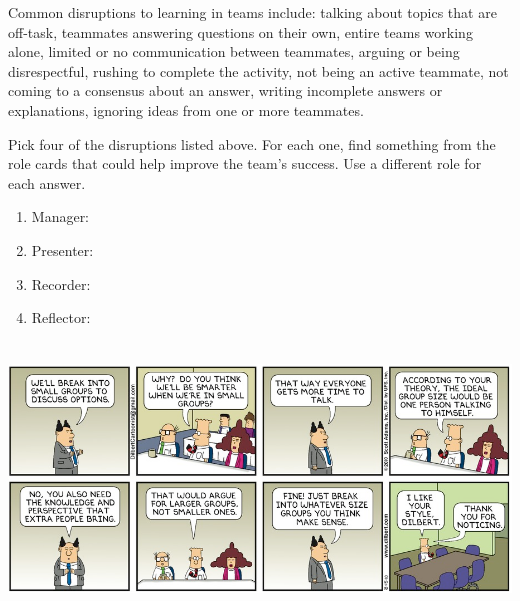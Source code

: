 

Common disruptions to learning in teams include:
  talking about topics that are off-task,
  teammates answering questions on their own,
  entire teams working alone,
  limited or no communication between teammates,
  arguing or being disrespectful,
  rushing to complete the activity,
  not being an active teammate,
  not coming to a consensus about an answer,
  writing incomplete answers or explanations,
  ignoring ideas from one or more teammates.




\Q Pick four of the disruptions listed above.
For each one, find something from the role cards that could help improve the team's success.
Use a different role for each answer.

\begin{enumerate}
\item Manager:
\vspace{2em}
\item Presenter:
\vspace{2em}
\item Recorder:
\vspace{2em}
\item Reflector:
\vspace{2em}
\end{enumerate}

\begin{center}
\includegraphics[height=2.85in]{Meta/disrupt1.png}
\end{center}
